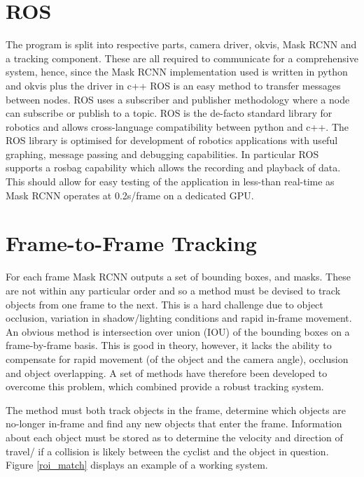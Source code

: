\documentclass[a4paper,11pt,notitlepage]{article}
\begin{document}
\section{ROS}

The program is split into respective parts, camera driver, okvis, Mask RCNN and a tracking component. These are all required to communicate for a comprehensive system, hence, since the Mask RCNN implementation used is written in python and okvis plus the driver in c++ ROS is an easy method to transfer messages between nodes. ROS uses a subscriber and publisher methodology where a node can subscribe or publish to a topic. ROS is the de-facto standard library for robotics and allows cross-language compatibility between python and c++.
\newline \newline
The ROS library is optimised for development of robotics applications with useful graphing, message passing and debugging capabilities. In particular ROS supports a rosbag capability which allows the recording and playback of data. This should allow for easy testing of the application in less-than real-time as Mask RCNN operates at 0.2s/frame on a dedicated GPU.


\section{Frame-to-Frame Tracking}

For each frame Mask RCNN outputs a set of bounding boxes, and masks. These are not within any particular order and so a method must be devised to track objects from one frame to the next. This is a hard challenge due to object occlusion, variation in shadow/lighting conditions and rapid in-frame movement. An obvious method is intersection over union (IOU) of the bounding boxes on a frame-by-frame basis. This is good in theory, however, it lacks the ability to compensate for rapid movement (of the object and the camera angle), occlusion and object overlapping. A set of methods have therefore been developed to overcome this problem, which combined provide a robust tracking system.

The method must both track objects in the frame, determine which objects are no-longer in-frame and find any new objects that enter the frame. Information about each object must be stored as to determine the velocity and direction of travel/ if a collision is likely between the cyclist and the object in question. Figure \ref{roi_match} displays an example of a working system.
\end{document}
